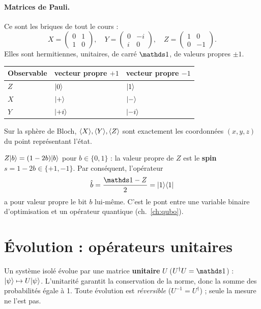 \paragraph{Matrices de Pauli.} Ce sont les briques de tout le cours :
\[
X=\begin{pmatrix}0&1\\1&0\end{pmatrix},\quad Y=\begin{pmatrix}0&-i\\i&0\end{pmatrix},\quad Z=\begin{pmatrix}1&0\\0&-1\end{pmatrix}.
\]
Elles sont hermitiennes, unitaires, de carré $\Id$, de valeurs propres $\pm1$.
\begin{center}
\begin{tabular}{lll}
\toprule
Observable & vecteur propre $+1$ & vecteur propre $-1$\\
\midrule
$Z$ & $\lvert 0\rangle$ & $\lvert 1\rangle$\\
$X$ & $\lvert +\rangle$ & $\lvert -\rangle$\\
$Y$ & $\lvert +i\rangle$ & $\lvert -i\rangle$\\
\bottomrule
\end{tabular}
\end{center}
Sur la sphère de Bloch, $\langle X\rangle,\langle Y\rangle,\langle Z\rangle$ sont exactement les coordonnées $(x,y,z)$ du point représentant l'état.

\begin{resultat}
$Z\lvert b\rangle=(1-2b)\lvert b\rangle$ pour $b\in\{0,1\}$ : la valeur propre de $Z$ est le \textbf{spin} $s=1-2b\in\{+1,-1\}$. Par conséquent, l'opérateur
\[\hat b=\frac{\Id-Z}{2}=\ket1\bra1\]
a pour valeur propre le bit $b$ lui-même. C'est le pont entre une variable binaire d'optimisation et un opérateur quantique (ch.~\ref{ch:qubo}).
\end{resultat}

\section{Évolution : opérateurs unitaires}\label{sec:unitaires}
\begin{definition}
Un système isolé évolue par une matrice \textbf{unitaire} $U$ ($U^\dagger U=\Id$) : $\lvert \psi\rangle\mapsto U\lvert \psi\rangle$. L'unitarité garantit la conservation de la norme, donc la somme des probabilités égale à 1. Toute évolution est \emph{réversible} ($U^{-1}=U^\dagger$) ; seule la mesure ne l'est pas.
\end{definition}

